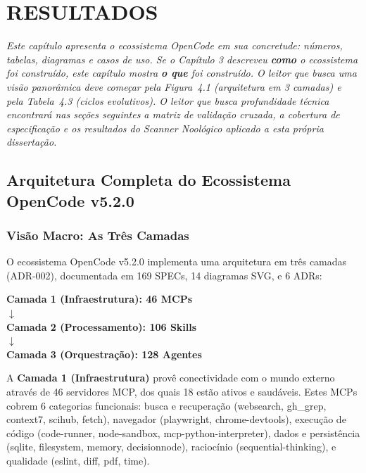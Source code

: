 
\chapter{RESULTADOS}
\label{ch:resultados}

{\small\itshape Este capítulo apresenta o ecossistema OpenCode em sua concretude: números, tabelas, diagramas e casos de uso. Se o Capítulo 3 descreveu \textbf{como} o ecossistema foi construído, este capítulo mostra \textbf{o que} foi construído. O leitor que busca uma visão panorâmica deve começar pela Figura~4.1 (arquitetura em 3 camadas) e pela Tabela~4.3 (ciclos evolutivos). O leitor que busca profundidade técnica encontrará nas seções seguintes a matriz de validação cruzada, a cobertura de especificação e os resultados do Scanner Noológico aplicado a esta própria dissertação.}

\section{Arquitetura Completa do Ecossistema OpenCode v5.2.0}

\subsection{Visão Macro: As Três Camadas}

O ecossistema OpenCode v5.2.0 implementa uma arquitetura em três camadas (ADR-002), documentada em 169 SPECs, 14 diagramas SVG, e 6 ADRs:

\begin{center}
\bfseries
Camada 1 (Infraestrutura): 46 MCPs\\
$\downarrow$\\
Camada 2 (Processamento): 106 Skills\\
$\downarrow$\\
Camada 3 (Orquestração): 128 Agentes
\end{center}

A \textbf{Camada 1 (Infraestrutura)} provê conectividade com o mundo externo através de 46 servidores MCP, dos quais 18 estão ativos e saudáveis. Estes MCPs cobrem 6 categorias funcionais: busca e recuperação (websearch, gh\_grep, context7, scihub, fetch), navegador (playwright, chrome-devtools), execução de código (code-runner, node-sandbox, mcp-python-interpreter), dados e persistência (sqlite, filesystem, memory, decisionnode), raciocínio (sequential-thinking), e qualidade (eslint, diff, pdf, time).

